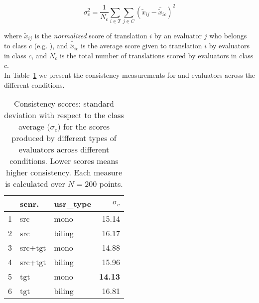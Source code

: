 \begin{equation}\label{eq:1}
\sigma_c^2 =   \frac{1}{N_c}\sum_{i \in T} \sum_{j\in C} (\tilde x_{ij} - \bar{\tilde x}_{ic})^2
\end{equation}

\noindent where $\tilde x_{ij}$ is the \emph{normalized} score of translation $i$ by an evaluator $j$ who belongs to class $c$ (e.g. \mono), and $\bar{\tilde x}_{ic}$ is the average score given to translation $i$ by evaluators in class $c$, and $N_c$ is the total number of translations scored by evaluators in class $c$. \\

In Table~\ref{tab:consistency} we present the consistency measurements for \mono and \bil evaluators across the different conditions. 



\begin{table}[ht]
\centering
\small
\begin{tabular}{rllr}%
  \toprule
 & scnr. & usr\_type & $\sigma_c$  \\%
  \midrule
1 & src & mono & 15.14 \\%
  2 & src & biling & 16.17 \\%
  3 & src+tgt & mono & 14.88 \\%
  4 & src+tgt & biling & 15.96 \\%
  5 & tgt & mono & {\bf 14.13} \\%
  6 & tgt & biling & 16.81 \\%
   \bottomrule
\end{tabular}
\caption{\label{tab:consistency}Consistency scores: standard deviation with respect to the class average ($\sigma_c$) %
for the scores produced by different types of evaluators across different conditions. Lower scores means higher consistency. Each measure is calculated over $N=200$ points.}
\vspace{-10pt}
\end{table}

